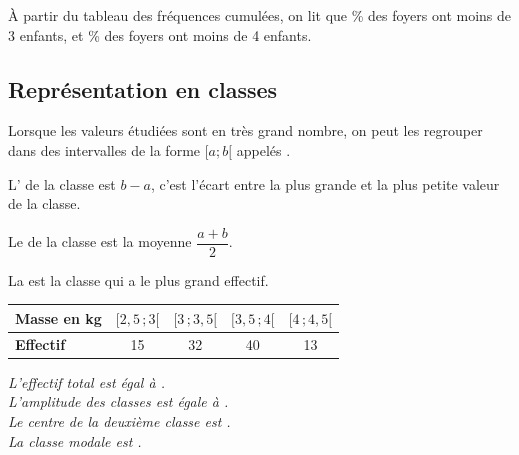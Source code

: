 \bigskip

À partir du tableau des fréquences cumulées, on lit que \comp \% des
foyers ont moins de 3 enfants, et \comp \% des foyers ont moins de 4 enfants.

\bigskip

\vspace{1cm}


\subsection{Représentation en classes}

Lorsque les valeurs étudiées sont en très grand nombre, on peut les
regrouper dans des intervalles de la forme $[a;b[$ appelés
    . 

    L' de la classe est $b-a$, c'est l'écart entre la plus
grande et la plus petite valeur de la classe.

Le  de la classe est la moyenne $\dfrac{a+b}2$.

La  est la classe qui a le plus grand effectif. 

\medskip

\smallskip

\hspace{4.5em}
\begin{minipage}[t]{0.8\linewidth}
  \begin{tabular}[t]{|l|c|c|c|c|}
    \hline
    \textbf{Masse en kg} & $[2,\!5\,;3[$ & $[3\,;3,\!5[$ & $[3,\!5\,;4[$ &
    $[4\,;4,\!5[$ \\
    \hline
    \textbf{Effectif} & 15 & 32 & 40 & 13 \\
    \hline
  \end{tabular}
  \bigskip
  
  \textit{L'effectif total est égal à \comp.} \\[1ex]
  \textit{L'amplitude des classes est égale à \comp.} \\[1ex]
  \textit{Le centre de la deuxième classe est \comp.} \\[1ex]
  \textit{La classe modale est \comp.}

\end{minipage}











